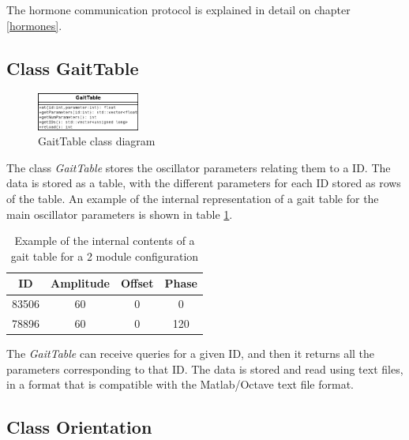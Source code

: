 The hormone communication protocol is explained in detail on chapter \ref{hormones}.\\

\newpage

\subsection{Class GaitTable}
\label{software_class_gaittable}

\begin{figure}[h]
		\centering
        \includegraphics[width=0.3\textwidth]{images/Class_diagram_GaitTable_members.png}
        \caption{GaitTable class diagram}\label{fig:software_class_gaittable_class}
\end{figure}

The class \emph{GaitTable} stores the oscillator parameters relating them to a ID. The data is stored as a table, with the different parameters for each ID stored as rows of the table. An example of the internal representation of a gait table for the main oscillator parameters is shown in table \ref{table:gait_table_example}. 

\begin{table}[h]
\centering
\begin{tabular}{|c||c|c|c|} \hline
 ID & Amplitude & Offset & Phase \\ \hline \hline
83506 & 60 & 0 & 0 \\ \hline
78896 & 60 & 0 & 120 \\ \hline 
\end{tabular}
\caption{Example of the internal contents of a gait table for a 2 module configuration}
\label{table:gait_table_example}
\end{table}

The \emph{GaitTable} can receive queries for a given ID, and then it returns all the parameters corresponding to that ID. The data is stored and read using text files, in a format that is compatible with the Matlab/Octave text file format.\\

\subsection{Class Orientation}
\label{software_class_orientation}


